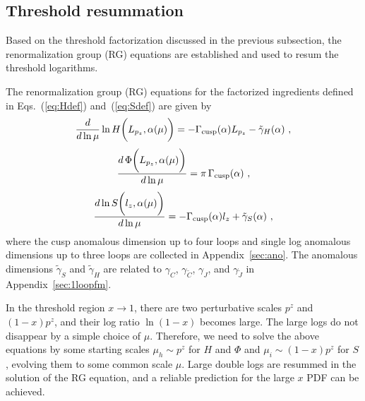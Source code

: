 \documentclass[a4paper,11pt]{article}
\begin{document}
\subsection{Threshold resummation}\label{sec:TRMS}
Based on the threshold factorization discussed in the previous subsection, the renormalization group (RG) equations are established and used to resum the threshold logarithms.

The renormalization group (RG) equations for the factorized ingredients defined in Eqs.~(\ref{eq:Hdef}) and~(\ref{eq:Sdef}) are given by~\cite{Ji:2023pba}
\begin{align}\label{eq:RGEHab}
\frac{d}{d\ln \mu} \ln   H\bigg(L_{p_z},\alpha(\mu)\bigg) = -\Gamma_{\rm cusp}(\alpha)L_{p_z} - \tilde {\gamma}_{H}(\alpha) \ ,
\end{align}   
\begin{align}\label{eq:RGEA}
\frac{d \, \Phi\bigg(L_{p_z},\alpha(\mu)\bigg)}{d\ln \mu} = \pi \, \Gamma_{\rm cusp}(\alpha) \ ,
\end{align}
\begin{align}\label{eq:RGEtiledJ}
\frac{d \ln S\bigg(l_z,\alpha(\mu)\bigg)}{d\ln \mu}= - \Gamma_{\rm cusp}(\alpha) l_z +  \tilde \gamma_{S}(\alpha) \ ,
\end{align}
where the cusp anomalous dimension up to four loops and single log anomalous dimensions up to three loops are collected in Appendix~\ref{sec:ano}. The anomalous dimensions $\tilde \gamma_S$ and $\tilde \gamma_H$ are related to $\gamma_C $, $\gamma_{\tilde C}$, $\gamma_J$, and $\gamma_{\tilde J}$ in Appendix~\ref{sec:1loopfm}. 

In the threshold region $x \rightarrow 1$, there are two perturbative scales $p^z$ and $(1-x)p^z$, and their log ratio $\ln(1-x)$ becomes large. The large logs
do not disappear by a simple choice of $\mu$. Therefore, we need to 
solve the above equations by some starting scales $\mu_h\sim p^z$ for $H$ and $\Phi$ and $\mu_i\sim (1-x)p^z$ for $S$, evolving them to some common scale $\mu$. Large double logs are resummed in the solution of the RG equation, and a reliable prediction for the large $x$ PDF can be achieved. 
\end{document}
